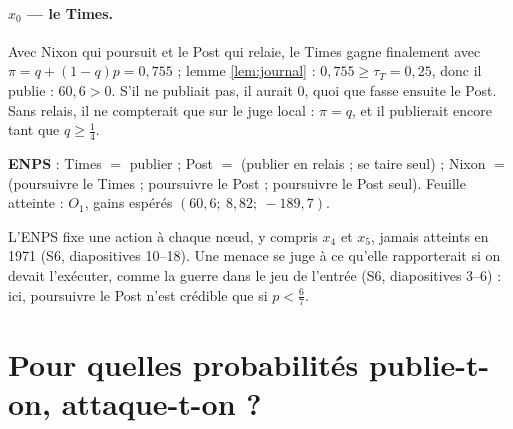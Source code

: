 \documentclass[11pt,a4paper]{article}
\theoremstyle{definition}
\begin{document}
\paragraph{$x_0$ — le Times.} Avec Nixon qui poursuit et le Post qui relaie, le Times gagne finalement avec $\pi=q+(1-q)p=0,755$ ; lemme \ref{lem:journal} : $0,755\ge\tau_T=0,25$, donc il publie : $60,6>0$. S'il ne publiait pas, il aurait $0$, quoi que fasse ensuite le Post. Sans relais, il ne compterait que sur le juge local : $\pi=q$, et il publierait encore tant que $q\ge\frac14$.

\begin{resultat}
\textbf{ENPS} : Times $=$ publier ; Post $=$ (publier en relais ; se taire seul) ; Nixon $=$ (poursuivre le Times ; poursuivre le Post ; poursuivre le Post seul). Feuille atteinte : $O_1$, gains espérés $(60,6;\ 8,82;\ -189,7)$.
\end{resultat}

\begin{cours}
L'ENPS fixe une action à chaque nœud, y compris $x_4$ et $x_5$, jamais atteints en 1971 (S6, diapositives 10--18). Une menace se juge à ce qu'elle rapporterait si on devait l'exécuter, comme la guerre dans le jeu de l'entrée (S6, diapositives 3--6) : ici, poursuivre le Post n'est crédible que si $p<\frac67$.
\end{cours}

\section{Pour quelles probabilités publie-t-on, attaque-t-on ?}
\end{document}
